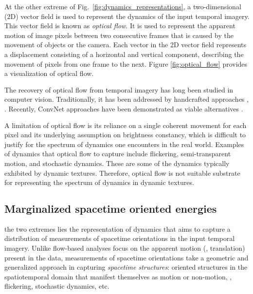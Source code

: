At the other extreme of Fig.\ \ref{fig:dynamics_representations}, a two-dimensional (2D) vector field is used to represent the dynamics of the input temporal imagery. This vector field is known as \emph{optical flow}. It is used to represent the apparent motion of image pixels between two consecutive frames that is caused by the movement of objects or the camera. Each vector in the 2D vector field represents a displacement consisting of a horizontal and vertical component, describing the movement of pixels from one frame to the next. Figure \ref{fig:optical_flow} provides a visualization of optical flow.

The recovery of optical flow from temporal imagery has long been studied in computer vision. Traditionally, it has been addressed by handcrafted approaches \eg, \cite{horn1981,lucas1981,revaud2015epicflow}. Recently, ConvNet approaches have been demonstrated as viable alternatives \cite{dosovitskiy2015,ilg2017,ranjan2017,yu2016}.

A limitation of optical flow is its reliance on a single coherent movement for each pixel and its underlying assumption on brightness constancy, which is difficult to justify for the spectrum of dynamics one encounters in the real world. Examples of dynamics that optical flow  to capture include flickering, semi-transparent motion, and stochastic dynamics. These are some of the dynamics typically exhibited by dynamic textures. Therefore, optical flow is not  suitable substrate for representing the spectrum of dynamics in dynamic textures.

\subsection{Marginalized spacetime oriented energies}
\label{sec:msoe}

 the two extremes lies the representation of dynamics that aims to capture a distribution of measurements of spacetime orientations in the input temporal imagery.
Unlike flow-based analyses  focus on the apparent motion (\ie, translation) present in the data, measurements of spacetime orientations take a geometric and generalized approach in capturing \emph{spacetime structures}: oriented structures in the spatiotemporal domain that manifest themselves as motion or non-motion, \eg, flickering, stochastic dynamics, etc.

